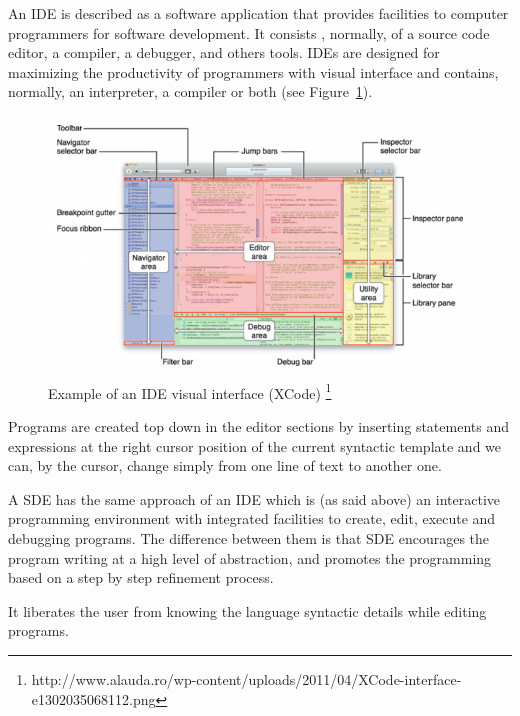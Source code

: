 \documentclass[
  oneside,
  11pt, a4paper,
  footinclude=true,
  headinclude=true,
  cleardoublepage=empty
]{scrbook}
\begin{document}
An IDE is described as a software application that provides facilities to computer programmers for software development. It consists , normally, of a source code editor, a compiler, a debugger, and others tools.
IDEs are designed for maximizing the productivity of programmers with visual interface and contains, normally, an interpreter, a compiler or both (see Figure~\ref{fig:ideXCode}).


\begin{figure}[h!]
  \centering
    \includegraphics[width=1\textwidth]{img/XCode-interface.png}
    \caption{Example of an IDE visual interface (XCode) \protect\footnote{http://www.alauda.ro/wp-content/uploads/2011/04/XCode-interface-e1302035068112.png}}
    \label{fig:ideXCode}
\end{figure}

\newpage

Programs are created top down in the editor sections by inserting statements and expressions at the right cursor position of the current syntactic template and we can, by the cursor, change simply from one line of text to another one.

A SDE has the same approach of an IDE which is (as said above) an interactive programming environment with integrated facilities to create, edit, execute and debugging programs.
The difference between them is that SDE encourages the program writing at a high level of abstraction, and promotes the programming based on a step by step refinement process.

It liberates the user from knowing the language syntactic details while editing programs.
\end{document}

